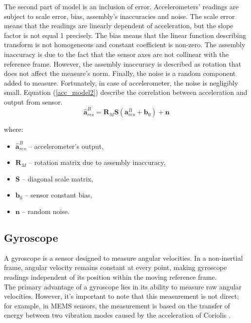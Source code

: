 The second part of model is an inclusion of error. Accelerometers' readings are subject to scale error, bias, assembly's inaccuracies and noise.
The scale error means that the readings are linearly dependent of acceleration, but the slope factor is not equal 1 precisely. The bias means that the linear function describing transform is not homogeneous and constant coefficient is non-zero. The assembly inaccuracy is due to the fact that the sensor axes are not collinear with the reference frame. However, the assembly inaccuracy is described as rotation that does not affect the measure's norm. Finally, the noise is a random component added to measure. Fortunately, in case of accelerometer, the noise is negligibly small. Equation (\ref{acc_model2}) describe the correlation between acceleration and output from sensor.\\


\begin{equation}
	\bm{\hat{a}}_{res}^B = \bm{R}_M \bm{S} \left( \bm{a}_{res}^B + \bm{b}_0 \right) + \bm{n}
	\label{acc_model2}
\end{equation}

where:
\begin{itemize}
	\item $\bm{\hat{a}}_{res}^B$ -- accelerometer's output,
	\item $\bm{R}_M$ -- rotation matrix due to assembly inaccuracy,
	\item $\bm{S}$ -- diagonal scale matrix,
	\item $\bm{b}_0$ -- sensor constant bias,
	\item $\bm{n}$ -- random noise.	
\end{itemize}



\subsection{Gyroscope}
A gyroscope is a sensor designed to measure angular velocities. In a non-inertial frame, angular velocity remains constant at every point, making gyroscope readings independent of its position within the moving reference frame.\\

The primary advantage of a gyroscope lies in its ability to measure raw angular velocities. However, it's important to note that this measurement is not direct; for example, in MEMS sensors, the measurement is based on the transfer of energy between two vibration modes caused by the acceleration of Coriolis \cite{passaro2017gyroscope}.\\

